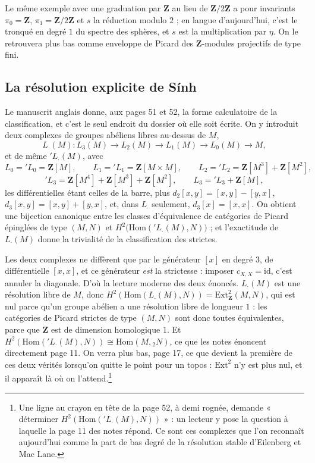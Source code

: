 \documentclass[11pt,a4paper]{article}
\begin{document}
Le même exemple avec une graduation par $\mathbf{Z}$ au lieu de
$\mathbf{Z}/2\mathbf{Z}$ a pour invariants $\pi_{0} = \mathbf{Z}$, $\pi_{1} =
\mathbf{Z}/2\mathbf{Z}$ et $s$ la réduction modulo $2$ ; en langue
d'aujourd'hui, c'est le tronqué en degré $1$ du spectre des sphères, et $s$
est la multiplication par $\eta$. On le retrouvera plus bas comme enveloppe de
Picard des $\mathbf{Z}$-modules projectifs de type fini.

\subsection*{La résolution explicite de Sính}

Le manuscrit anglais donne, aux pages 51 et 52, la forme calculatoire de la
classification, et c'est le seul endroit du dossier où elle soit écrite. On y
introduit deux complexes de groupes abéliens libres au-dessus de $M$,
\[
L_{\cdot}(M) : L_{3}(M) \to L_{2}(M) \to L_{1}(M) \to L_{0}(M) \to M,
\]
et de même ${}'L_{\cdot}(M)$, avec
\[
L_{0} = {}'L_{0} = \mathbf{Z}[M], \qquad
L_{1} = {}'L_{1} = \mathbf{Z}[M \times M], \qquad
L_{2} = {}'L_{2} = \mathbf{Z}[M^{3}] + \mathbf{Z}[M^{2}],
\]
\[
{}'L_{3} = \mathbf{Z}[M^{4}] + \mathbf{Z}[M^{3}] + \mathbf{Z}[M^{2}],
\qquad L_{3} = {}'L_{3} + \mathbf{Z}[M],
\]
les différentielles étant celles de la barre, plus $d_{2}[x,y] = [x,y] -
[y,x]$, $d_{3}[x,y] = [x,y] + [y,x]$, et, dans $L_{\cdot}$ seulement,
$d_{3}[x] = [x,x]$. On obtient une bijection canonique entre les classes
d'équivalence de catégories de Picard épinglées de type $(M,N)$ et
$H^{2}\bigl(\mathrm{Hom}({}'L_{\cdot}(M), N)\bigr)$ ; et l'exactitude de
$L_{\cdot}(M)$ donne la trivialité de la classification des strictes.

Les deux complexes ne diffèrent que par le générateur $[x]$ en degré $3$, de
différentielle $[x,x]$, et ce générateur \emph{est} la strictesse : imposer
$c_{X,X} = \mathrm{id}$, c'est annuler la diagonale. D'où la lecture moderne
des deux énoncés. $L_{\cdot}(M)$ est une résolution libre de $M$, donc
$H^{2}(\mathrm{Hom}(L_{\cdot}(M),N)) = \mathrm{Ext}^{2}_{\mathbf{Z}}(M,N)$,
qui est nul parce qu'un groupe abélien a une résolution libre de longueur
$1$ : les catégories de Picard strictes de type $(M,N)$ sont donc toutes
équivalentes, parce que $\mathbf{Z}$ est de dimension
homologique $1$. Et $H^{2}(\mathrm{Hom}({}'L_{\cdot}(M),N)) \cong
\mathrm{Hom}(M, {}_{2}N)$, ce que les notes énoncent directement page 11. On
verra plus bas, page 17, ce que devient la première de ces deux vérités
lorsqu'on quitte le point pour un topos : $\mathrm{Ext}^{2}$ n'y est plus nul,
et il apparaît là où on l'attend.\footnote{Une ligne au crayon en tête de la
page 52, à demi rognée, demande « déterminer $H^{2}(\mathrm{Hom}({}'L_{\cdot}
(M), N))$ » : un lecteur y pose la question à laquelle la page 11
des notes répond. Ce sont ces complexes que l'on reconnaît aujourd'hui comme
la part de bas degré de la résolution stable d'Eilenberg et Mac Lane.}
\end{document}
